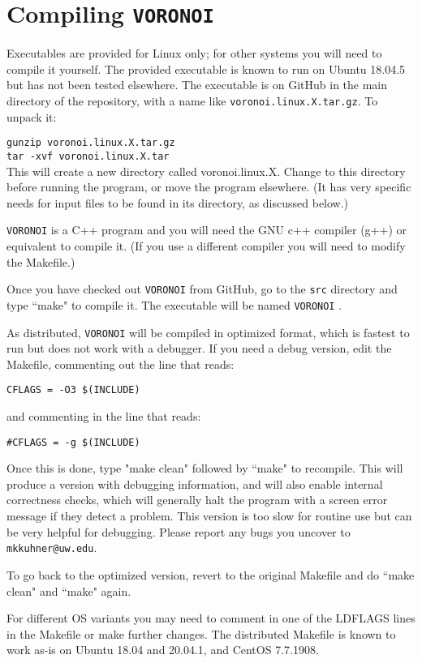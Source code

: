 \documentclass[10pt,titlepage,times,letterpaper]{article}
\def\VORONOI{{\tt VORONOI} }
\begin{document}
\section{Compiling \VORONOI}

Executables are provided for Linux only; for other systems you will
need to compile it yourself.  The provided executable is known to run
on Ubuntu 18.04.5 but has not been tested elsewhere.  The executable
is on GitHub in the main directory of the repository, with a name like
{\tt voronoi.linux.X.tar.gz}.  To unpack it:

{\tt gunzip voronoi.linux.X.tar.gz} \\
{\tt tar -xvf voronoi.linux.X.tar} \\

This will create a new directory called voronoi.linux.X.  Change to this
directory before running the program, or move the program elsewhere.
(It has very specific needs for input files to be found in its directory,
as discussed below.)

\VORONOI is a C++ program and you will need the
GNU c++ compiler (g++) or equivalent to compile it.  (If you use a different
compiler you will need to modify the Makefile.)

Once you have checked out \VORONOI from GitHub, go to the {\tt src} directory
and type ``make" to compile it.  The executable will be named \VORONOI.

As distributed, \VORONOI will be compiled in optimized format, which is
fastest to run but does not work with a debugger.  If you need a debug
version, edit the Makefile, commenting out the line that reads:

{\tt CFLAGS = -O3 \$(INCLUDE)}

and commenting in the line that reads:

{\tt \#CFLAGS = -g \$(INCLUDE)}

Once this is done, type "make clean" followed by ``make" to recompile.  
This will produce a version with debugging information, and will also
enable internal correctness checks, which will generally
halt the program with a screen error message if they detect a problem.  
This version is too slow for routine use but can be very helpful for debugging.
Please report any bugs you uncover to {\tt mkkuhner@uw.edu}.

To go back to the optimized version, revert to the original Makefile
and do ``make clean" and ``make" again.

For different OS variants you may need to comment in one of 
the LDFLAGS lines in the Makefile or make further changes.  The 
distributed Makefile is known to work as-is on Ubuntu 18.04 and 
20.04.1, and CentOS 7.7.1908.  
\end{document}
